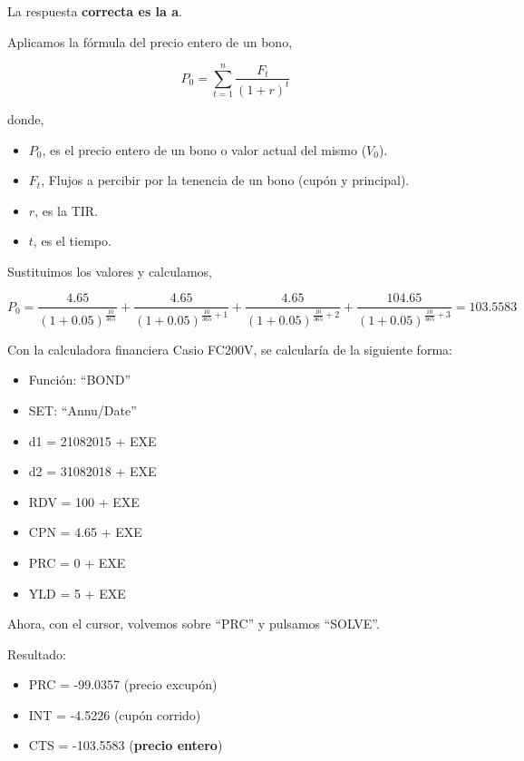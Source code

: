 \documentclass[
  letterpaper,
  DIV=11,
  numbers=noendperiod]{scrreprt}
\begin{document}
\begin{tcolorbox}[enhanced jigsaw, left=2mm, opacityback=0, colback=white, breakable, arc=.35mm, bottomrule=.15mm, rightrule=.15mm, toprule=.15mm, leftrule=.75mm, colframe=quarto-callout-tip-color-frame]
\begin{minipage}[t]{5.5mm}
\textcolor{quarto-callout-tip-color}{\faLightbulb}
\end{minipage}%
\begin{minipage}[t]{\textwidth - 5.5mm}

La respuesta \textbf{correcta es la a}.

Aplicamos la fórmula del precio entero de un bono,

\[P_0=\sum_{ t=1}^{ n}\frac{F_t}{(1+r)^{t}}\]

donde,

\begin{itemize}
\item
  \(P_0\), es el precio entero de un bono o valor actual del mismo
  (\(V_0\)).
\item
  \(F_t\), Flujos a percibir por la tenencia de un bono (cupón y
  principal).
\item
  \(r\), es la TIR.
\item
  \(t\), es el tiempo.
\end{itemize}

Sustituimos los valores y calculamos,

\[P_0=\frac{4.65}{\left(1+0.05\right)^{\frac{10}{365}}}+\frac{4.65}{\left(1+0.05\right)^{\frac{10}{365}+1}}+\frac{4.65}{\left(1+0.05\right)^{\frac{10}{365}+2}}+\frac{104.65}{\left(1+0.05\right)^{\frac{10}{365}+3}}=103.5583\]

Con la calculadora financiera Casio FC200V, se calcularía de la
siguiente forma:

\begin{itemize}
\item
  Función: ``BOND''
\item
  SET: ``Annu/Date''
\item
  d1 = 21082015 + EXE
\item
  d2 = 31082018 + EXE
\item
  RDV = 100 + EXE
\item
  CPN = 4.65 + EXE
\item
  PRC = 0 + EXE
\item
  YLD = 5 + EXE
\end{itemize}

Ahora, con el cursor, volvemos sobre ``PRC'' y pulsamos ``SOLVE''.

Resultado:

\begin{itemize}
\item
  PRC = -99.0357 (precio excupón)
\item
  INT = -4.5226 (cupón corrido)
\item
  CTS = -103.5583 (\textbf{precio entero})
\end{itemize}

\end{minipage}%
\end{tcolorbox}
\end{document}

